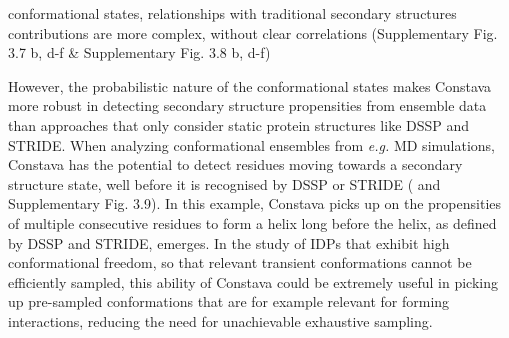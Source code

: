 \newpage 
\noindent conformational states, relationships with traditional secondary structures contributions are more complex, without clear correlations (Supplementary Fig. 3.7 b, d-f \& Supplementary Fig. 3.8 b, d-f)


However, the probabilistic nature of the conformational states makes Constava more robust in detecting secondary structure propensities from ensemble data than approaches that only consider static protein structures like  DSSP and STRIDE. When analyzing conformational ensembles from \textit{e.g.} MD simulations, Constava has the potential to detect residues moving towards a secondary structure state, well before it is recognised by DSSP or STRIDE ( and Supplementary Fig. 3.9).
In this example, Constava picks up on the propensities of multiple consecutive residues to form a helix long before the helix, as defined by DSSP and STRIDE, emerges. In the study of IDPs that exhibit high conformational freedom, so that relevant transient conformations cannot be efficiently sampled, this ability of Constava could be extremely useful in picking up pre-sampled conformations that are for example relevant for forming interactions, reducing the need for unachievable exhaustive sampling.

